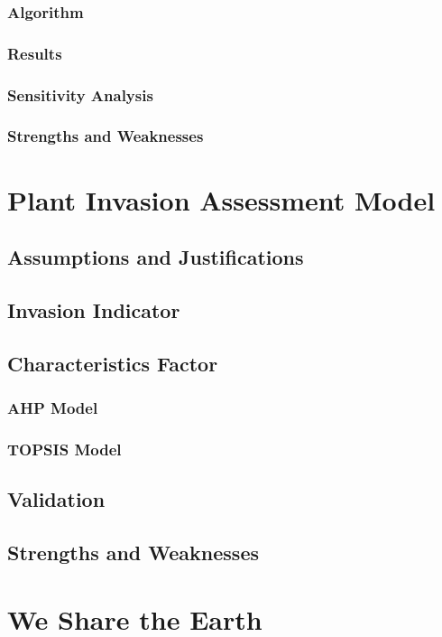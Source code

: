 \documentclass[12pt]{article}
\begin{document}
		\subsubsection{Algorithm}
		
		\subsubsection{Results}
		
		\subsubsection{Sensitivity Analysis}
		
		\subsubsection{Strengths and Weaknesses}
	
	
\section{Plant Invasion Assessment Model}

	\subsection{Assumptions and Justifications}
	
	\subsection{Invasion Indicator}
	
	\subsection{Characteristics Factor}
	
		\subsubsection{AHP Model}
			
		\subsubsection{TOPSIS Model}
	
	\subsection{Validation}
	
	\subsection{Strengths and Weaknesses}

\section*{We Share the Earth}

\newrefcontext[sorting=nyt]
\printbibliography
\end{document}
